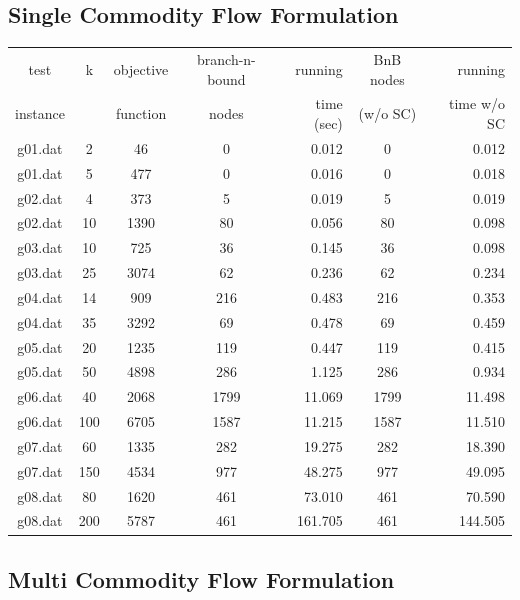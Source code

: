 \documentclass[,%
			paper=a4,%
			DIV14,
			liststotoc,
			bibtotoc,
			draft=false,%
			numbers=noendperiod
			]{scrartcl}
\begin{document}
\subsection{Single Commodity Flow Formulation}

\begin{tabular}{||c||cccr|cr||}

\hline
test     & k & objective  & branch-n-bound & running   & BnB nodes & running\\
instance &   & function   & nodes          & time (sec)& (w/o SC)  & time w/o SC \\
\hline

g01.dat	&	2	&	46	&	0	&	0.012	&	0	&	0.012	\\
g01.dat	&	5	&	477	&	0	&	0.016	&	0	&	0.018	\\
g02.dat	&	4	&	373	&	5	&	0.019	&	5	&	0.019	\\
g02.dat	&	10	&	1390	&	80	&	0.056	&	80	&	0.098	\\
g03.dat	&	10	&	725	&	36	&	0.145	&	36	&	0.098	\\
g03.dat	&	25	&	3074	&	62	&	0.236	&	62	&	0.234	\\
g04.dat	&	14	&	909	&	216	&	0.483	&	216	&	0.353	\\
g04.dat	&	35	&	3292	&	69	&	0.478	&	69	&	0.459	\\
g05.dat	&	20	&	1235	&	119	&	0.447	&	119	&	0.415	\\
g05.dat	&	50	&	4898	&	286	&	1.125	&	286	&	0.934	\\
g06.dat	&	40	&	2068	&	1799	&	11.069	&	1799	&	11.498	\\
g06.dat	&	100	&	6705	&	1587	&	11.215	&	1587	&	11.510	\\
g07.dat	&	60	&	1335	&	282	&	19.275	&	282	&	18.390	\\
g07.dat	&	150	&	4534	&	977	&	48.275	&	977	&	49.095	\\
g08.dat	&	80	&	1620	&	461	&	73.010	&	461	&	70.590	\\
g08.dat	&	200	&	5787	&	461	&	161.705	&	461	&	144.505	\\

\hline

\end{tabular}

\subsection{Multi Commodity Flow Formulation}
\end{document}
